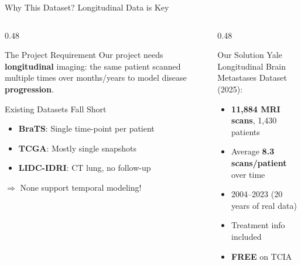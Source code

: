 \documentclass[aspectratio=169,xcolor=dvipsnames]{beamer}
\begin{document}
\begin{frame}{Why This Dataset? Longitudinal Data is Key}
    \begin{columns}
        \begin{column}{0.48\textwidth}
            \begin{alertblock}{The Project Requirement}
                \small
                Our project needs \textbf{longitudinal} imaging: the same patient scanned multiple times over months/years to model disease \textbf{progression}.
            \end{alertblock}

            \vspace{0.2em}

            \begin{block}{Existing Datasets Fall Short}
                \small
                \begin{itemize}
                    \item \textbf{BraTS}: Single time-point per patient
                    \item \textbf{TCGA}: Mostly single snapshots
                    \item \textbf{LIDC-IDRI}: CT lung, no follow-up
                \end{itemize}
                $\Rightarrow$ None support temporal modeling!
            \end{block}
        \end{column}

        \begin{column}{0.48\textwidth}
            \begin{exampleblock}{Our Solution}
                \small
                Yale Longitudinal Brain Metastases Dataset (2025):
                \begin{itemize}
                    \item \textbf{11,884 MRI scans}, 1,430 patients
                    \item Average \textbf{8.3 scans/patient} over time
                    \item 2004--2023 (20 years of real data)
                    \item Treatment info included
                    \item \textbf{FREE} on TCIA
                \end{itemize}
            \end{exampleblock}


\end{column}
\end{columns}
\end{frame}
\end{document}
